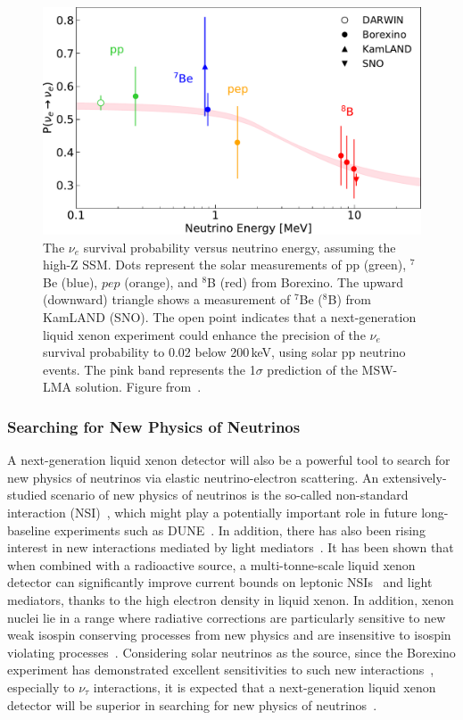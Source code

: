\begin{figure}[!htbp]
    \centering
    \includegraphics[width=\columnwidth]{fig_nu_surv_vs_energy.pdf}
    \caption{The $\nu_e$ survival probability versus neutrino energy, assuming the high-Z SSM. Dots represent the solar measurements of pp (green), $^7$Be (blue), $pep$ (orange), and $^8$B (red) from Borexino. The upward (downward) triangle shows a measurement of $^7$Be ($^8$B) from KamLAND (SNO). The open point indicates that a next-generation liquid xenon experiment could enhance the precision of the $\nu_e$ survival probability to 0.02 below 200\,keV, using solar pp neutrino events. The pink band represents the 1$\sigma$ prediction of the MSW-LMA solution. Figure from~\cite{Aalbers:2020gsn}.}
    \label{fig:nusurvival}
\end{figure}

\subsubsection{Searching for New Physics of Neutrinos}

A next-generation liquid xenon detector will also be a powerful tool to search for new physics of neutrinos via elastic neutrino-electron scattering. An extensively-studied scenario of new physics of neutrinos is the so-called non-standard interaction (NSI)~\cite{Dev:2019anc}, which might play a potentially important role in future long-baseline experiments such as DUNE~\cite{deGouvea:2015ndi}. In addition, there has also been rising interest in new interactions mediated by light mediators~\cite{Datta:2017ezo,AristizabalSierra:2020edu,Khan:2020vaf}. It has been shown that when combined with a radioactive source, a multi-tonne-scale liquid xenon detector can significantly improve current bounds on leptonic NSIs~\cite{Link:2019pbm} and light mediators, thanks to the high electron density in liquid xenon. In addition, xenon nuclei lie in a range where radiative corrections are particularly sensitive to new weak isospin conserving processes from new physics and are insensitive to isospin violating processes~\cite{Krauss:1991ba}.  Considering solar neutrinos as the source, since the Borexino experiment has demonstrated excellent sensitivities to such new interactions~\cite{Khan:2019jvr, Kamada:2015era}, especially to $\nu_{\tau}$ interactions, it is expected that a next-generation liquid xenon detector will be superior in searching for new physics of neutrinos~\cite{Dutta:2020che}.

